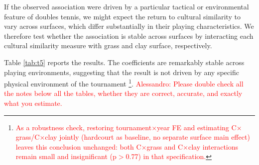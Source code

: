 \documentclass[10pt]{article}
\begin{document}
If the observed association were driven by a particular tactical or environmental feature of doubles tennis, we might expect the return to cultural similarity to vary across surfaces, which differ substantially in their playing characteristics. We therefore test whether the association is stable across surfaces by interacting each cultural similarity measure with grass and clay surface, respectively. 


Table \ref{tab:t5} reports the results. The coefficients are remarkably stable across playing environments, suggesting that the result is not driven by any specific physical environment of the tournament \footnote{\textcolor{red}{As a robustness check, restoring tournament$\times$year FE and estimating C$\times$grass/C$\times$clay jointly (hardcourt as baseline, no separate surface main effect) leaves this conclusion unchanged: both C$\times$grass and C$\times$clay interactions remain small and insignificant (p$>$0.77) in that specification.}}. \textcolor{red}{Alessandro: Please double check all the notes below all the tables, whether they are correct, accurate, and exactly what you estimate.}
\end{document}
